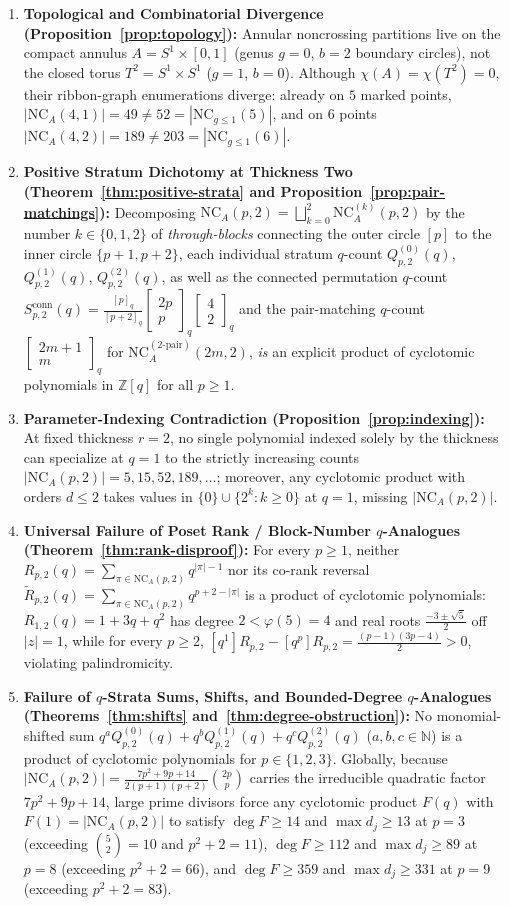 \documentclass[11pt,a4paper]{article}
\theoremstyle{definition}
\theoremstyle{remark}
\newcommand{\NCA}{\mathrm{NC}_A}
\newcommand{\NC}{\mathrm{NC}}
\newcommand{\qbinom}[2]{\begin{bmatrix} #1 \\ #2 \end{bmatrix}_q}
\begin{document}
\begin{enumerate}
  \item[\textbf{(1)}] \textbf{Topological and Combinatorial Divergence (Proposition~\ref{prop:topology}):} Annular noncrossing partitions live on the compact annulus $A = S^1 \times [0,1]$ (genus $g = 0$, $b = 2$ boundary circles), not the closed torus $T^2 = S^1 \times S^1$ ($g = 1$, $b = 0$). Although $\chi(A) = \chi(T^2) = 0$, their ribbon-graph enumerations diverge: already on $5$ marked points, $|\NCA(4,1)| = 49 \neq 52 = |\NC_{g \le 1}(5)|$, and on $6$ points $|\NCA(4,2)| = 189 \neq 203 = |\NC_{g \le 1}(6)|$.
  \item[\textbf{(2)}] \textbf{Positive Stratum Dichotomy at Thickness Two (Theorem~\ref{thm:positive-strata} and Proposition~\ref{prop:pair-matchings}):} Decomposing $\NCA(p,2) = \bigsqcup_{k=0}^2 \NCA^{(k)}(p,2)$ by the number $k \in \{0,1,2\}$ of \emph{through-blocks} connecting the outer circle $[p]$ to the inner circle $\{p+1,p+2\}$, each individual stratum $q$-count $Q^{(0)}_{p,2}(q)$, $Q^{(1)}_{p,2}(q)$, $Q^{(2)}_{p,2}(q)$, as well as the connected permutation $q$-count $S^{\mathrm{conn}}_{p,2}(q) = \frac{[p]_q}{[p+2]_q}\qbinom{2p}{p}\qbinom{4}{2}$ and the pair-matching $q$-count $\qbinom{2m+1}{m}$ for $\NCA^{(2\text{-pair})}(2m,2)$, \emph{is} an explicit product of cyclotomic polynomials in $\mathbb{Z}[q]$ for all $p \ge 1$.
  \item[\textbf{(3)}] \textbf{Parameter-Indexing Contradiction (Proposition~\ref{prop:indexing}):} At fixed thickness $r = 2$, no single polynomial indexed solely by the thickness can specialize at $q = 1$ to the strictly increasing counts $|\NCA(p,2)| = 5, 15, 52, 189, \dots$; moreover, any cyclotomic product with orders $d \le 2$ takes values in $\{0\} \cup \{2^k : k \ge 0\}$ at $q = 1$, missing $|\NCA(p,2)|$.
  \item[\textbf{(4)}] \textbf{Universal Failure of Poset Rank / Block-Number $q$-Analogues (Theorem~\ref{thm:rank-disproof}):} For every $p \ge 1$, neither $R_{p,2}(q) = \sum_{\pi \in \NCA(p,2)} q^{|\pi|-1}$ nor its co-rank reversal $\tilde{R}_{p,2}(q) = \sum_{\pi \in \NCA(p,2)} q^{p+2-|\pi|}$ is a product of cyclotomic polynomials: $R_{1,2}(q) = 1 + 3q + q^2$ has degree $2 < \varphi(5) = 4$ and real roots $\frac{-3 \pm \sqrt{5}}{2}$ off $|z| = 1$, while for every $p \ge 2$, $[q^1]R_{p,2} - [q^p]R_{p,2} = \frac{(p-1)(3p-4)}{2} > 0$, violating palindromicity.
  \item[\textbf{(5)}] \textbf{Failure of $q$-Strata Sums, Shifts, and Bounded-Degree $q$-Analogues (Theorems~\ref{thm:shifts} and~\ref{thm:degree-obstruction}):} No monomial-shifted sum $q^a Q^{(0)}_{p,2}(q) + q^b Q^{(1)}_{p,2}(q) + q^c Q^{(2)}_{p,2}(q)$ ($a,b,c \in \mathbb{N}$) is a product of cyclotomic polynomials for $p \in \{1,2,3\}$. Globally, because $|\NCA(p,2)| = \frac{7p^2 + 9p + 14}{2(p+1)(p+2)}\binom{2p}{p}$ carries the irreducible quadratic factor $7p^2 + 9p + 14$, large prime divisors force any cyclotomic product $F(q)$ with $F(1) = |\NCA(p,2)|$ to satisfy $\deg F \ge 14$ and $\max d_j \ge 13$ at $p = 3$ (exceeding $\binom{5}{2} = 10$ and $p^2 + 2 = 11$), $\deg F \ge 112$ and $\max d_j \ge 89$ at $p = 8$ (exceeding $p^2 + 2 = 66$), and $\deg F \ge 359$ and $\max d_j \ge 331$ at $p = 9$ (exceeding $p^2 + 2 = 83$).

\end{enumerate}
\end{document}
